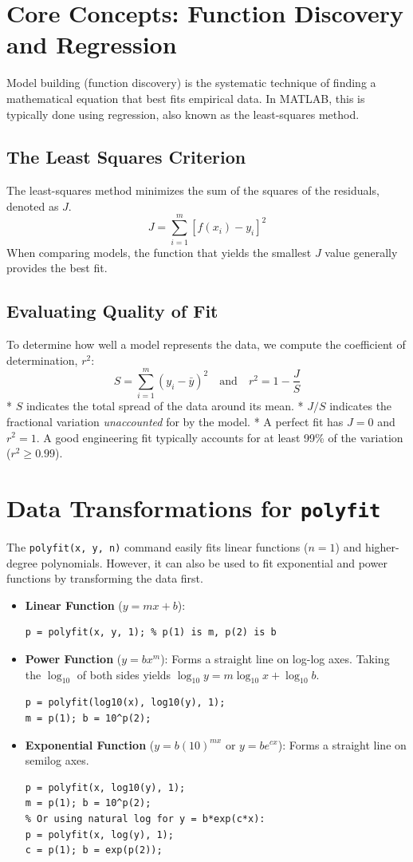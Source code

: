 \section{Core Concepts: Function Discovery and Regression}
Model building (function discovery) is the systematic technique of finding a mathematical equation that best fits empirical data. In MATLAB, this is typically done using regression, also known as the least-squares method.

\subsection{The Least Squares Criterion}
The least-squares method minimizes the sum of the squares of the residuals, denoted as $J$. 
$$J = \sum_{i=1}^{m} [f(x_i) - y_i]^2$$
When comparing models, the function that yields the smallest $J$ value generally provides the best fit.

\subsection{Evaluating Quality of Fit}
To determine how well a model represents the data, we compute the coefficient of determination, $r^2$:
$$S = \sum_{i=1}^{m} (y_i - \bar{y})^2 \quad \text{and} \quad r^2 = 1 - \frac{J}{S}$$
* $S$ indicates the total spread of the data around its mean.
* $J/S$ indicates the fractional variation \textit{unaccounted} for by the model.
* A perfect fit has $J=0$ and $r^2=1$. A good engineering fit typically accounts for at least 99\% of the variation ($r^2 \ge 0.99$).

\section{Data Transformations for \texttt{polyfit}}
The \texttt{polyfit(x, y, n)} command easily fits linear functions ($n=1$) and higher-degree polynomials. However, it can also be used to fit exponential and power functions by transforming the data first.

\begin{itemize}
    \item \textbf{Linear Function} ($y = mx + b$): 
    \begin{lstlisting}
p = polyfit(x, y, 1); % p(1) is m, p(2) is b
    \end{lstlisting}
    \item \textbf{Power Function} ($y = bx^m$): Forms a straight line on log-log axes. Taking the $\log_{10}$ of both sides yields $\log_{10} y = m \log_{10} x + \log_{10} b$.
    \begin{lstlisting}
p = polyfit(log10(x), log10(y), 1);
m = p(1); b = 10^p(2);
    \end{lstlisting}
    \item \textbf{Exponential Function} ($y = b(10)^{mx}$ or $y = be^{cx}$): Forms a straight line on semilog axes. 
    \begin{lstlisting}
p = polyfit(x, log10(y), 1);
m = p(1); b = 10^p(2);
% Or using natural log for y = b*exp(c*x):
p = polyfit(x, log(y), 1); 
c = p(1); b = exp(p(2));
    \end{lstlisting}
\end{itemize}

